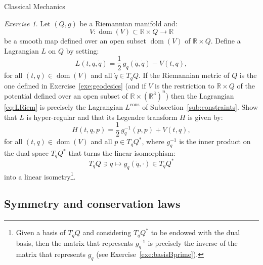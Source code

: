 \documentclass[oneside,a4paper,11pt]{amsbook}
\newcommand{\R}{\mathds R}
\DeclareMathOperator{\Dom}{dom}
\theoremstyle{remark}\newtheorem{exercise}{Exercise}[chapter]
\theoremstyle{plain}\newtheorem{teo}{Theorem}[section]
\theoremstyle{plain}\newtheorem{lem}[teo]{Lemma}
\theoremstyle{plain}\newtheorem{prop}[teo]{Proposition}
\theoremstyle{plain}\newtheorem{cor}[teo]{Corollary}
\theoremstyle{definition}\newtheorem{defin}[teo]{Definition}
\theoremstyle{remark}\newtheorem{rem}[teo]{Remark}
\theoremstyle{definition}\newtheorem{notation}[teo]{Notation}
\theoremstyle{definition}\newtheorem{convention}[teo]{Convention}
\theoremstyle{definition}\newtheorem{example}[teo]{Example}
\numberwithin{section}{chapter}
\numberwithin{equation}{section}
\begin{document}
\begin{chapter}{Classical Mechanics}
\begin{exercise}\label{exe:LegRiem}
Let $(Q,g)$ be a Riemannian manifold and:
\[V:\Dom(V)\subset\R\times Q\longrightarrow\R\]
be a smooth map defined over an open subset $\Dom(V)$ of $\R\times Q$.
Define a Lagrangian $L$ on $Q$ by setting:
\begin{equation}\label{eq:LRiem}
L(t,q,\dot q)=\frac12\,g_q(\dot q,\dot q)-V(t,q),
\end{equation}
for all $(t,q)\in\Dom(V)$ and all $\dot q\in T_qQ$. If the Riemannian metric of $Q$ is the one defined in Exercise~\ref{exe:geodesics} (and if $V$
is the restriction to $\R\times Q$ of the potential defined over an open subset of $\R\times(\R^3)^n$) then the Lagrangian \eqref{eq:LRiem} is precisely
the Lagrangian $L^{\mathrm{cons}}$ of Subsection~\ref{sub:constraints}. Show that $L$ is hyper-regular and that its Legendre transform $H$ is given by:
\[H(t,q,p)=\frac12\,g_q^{-1}(p,p)+V(t,q),\]
for all $(t,q)\in\Dom(V)$ and all $p\in T_qQ^*$, where $g_q^{-1}$ is the inner product on the dual space $T_qQ^*$ that turns the linear isomorphism:
\[T_qQ\ni\dot q\longmapsto g_q(\dot q,\cdot)\in T_qQ^*\]
into a linear isometry\footnote{%
Given a basis of $T_qQ$ and considering $T_qQ^*$ to be endowed with the dual basis, then the matrix that represents $g_q^{-1}$ is precisely
the inverse of the matrix that represents $g_q$ (see Exercise~\ref{exe:basisBprime}).}.
\end{exercise}

\subsection*{Symmetry and conservation laws}


\end{chapter}
\end{document}
